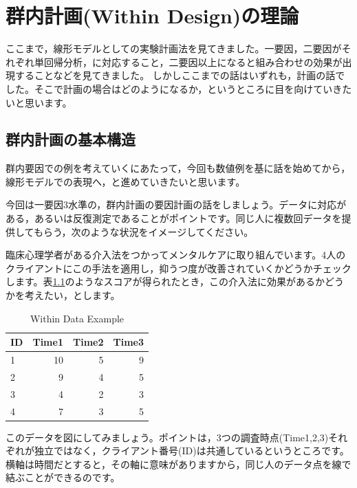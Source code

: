 \documentclass{ltjbook}
\begin{document}
\chapter{群内計画(Within Design)の理論}
\label{ch21_WithinDesign}

ここまで，線形モデルとしての実験計画法を見てきました。一要因，二要因がそれぞれ単回帰分析，に対応すること，二要因以上になると組み合わせの効果が出現することなどを見てきました。
しかしここまでの話はいずれも，計画の話でした。そこで計画の場合はどのようになるか，というところに目を向けていきたいと思います。
\section{群内計画の基本構造}
群内要因での例を考えていくにあたって，今回も数値例を基に話を始めてから，線形モデルでの表現へ，と進めていきたいと思います。

今回は一要因3水準の，群内計画の要因計画の話をしましょう。データに対応がある，あるいは反復測定であることがポイントです。同じ人に複数回データを提供してもらう，次のような状況をイメージしてください。

臨床心理学者がある介入法をつかってメンタルケアに取り組んでいます。4人のクライアントにこの手法を適用し，抑うつ度が改善されていくかどうかチェックします。表\ref{tbl:21_01}のようなスコアが得られたとき，この介入法に効果があるかどうかを考えたい，とします。
\begin{table}[h]
	\centering
	\caption{Within Data Example}
	\begin{tabular}{lrrr}
		\hline
		ID & Time1 & Time2 & Time3 \\
		\hline
		1  & 10    & 5     & 9     \\
		2  & 9     & 4     & 5     \\
		3  & 4     & 2     & 3     \\
		4  & 7     & 3     & 5     \\
		\hline
	\end{tabular}
	\label{tbl:21_01}
\end{table}
このデータを図にしてみましょう。ポイントは，3つの調査時点(Time1,2,3)それぞれが独立ではなく，クライアント番号(ID)は共通しているというところです。横軸は時間だとすると，その軸に意味がありますから，同じ人のデータ点を線で結ぶことができるのです。
\end{document}
